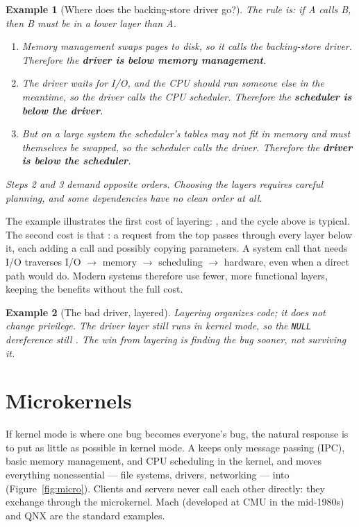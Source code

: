 \documentclass[11pt]{article}
\newtheorem{example}{Example}
\begin{document}
\begin{example}[Where does the backing-store driver go?]
The rule is: if A calls B, then B must be in a \emph{lower} layer than A.
\begin{enumerate}
  \item Memory management swaps pages to disk, so it calls the backing-store
        driver. Therefore the \textbf{driver is below memory management}.
  \item The driver waits for I/O, and the CPU should run someone else in the
        meantime, so the driver calls the CPU scheduler. Therefore the
        \textbf{scheduler is below the driver}.
  \item But on a large system the scheduler's tables may not fit in memory
        and must themselves be swapped, so the scheduler calls the driver.
        Therefore the \textbf{driver is below the scheduler}.
\end{enumerate}
Steps 2 and 3 demand opposite orders. Choosing the layers requires careful
planning, and some dependencies have no clean order at all.
\end{example}

The example illustrates the first cost of layering: , and the cycle above is typical. The second cost is that : a request from the top passes through every layer below it,
each adding a call and possibly copying parameters. A system call that needs
I/O traverses I/O $\to$ memory $\to$ scheduling $\to$ hardware, even when a
direct path would do. Modern systems therefore use fewer, more functional
layers, keeping the benefits without the full cost.

\begin{example}[The bad driver, layered]
Layering organizes code; it does not change privilege. The driver layer still
runs in kernel mode, so the \texttt{NULL} dereference still . The win from layering is finding the bug sooner, not surviving
it.
\end{example}

\section{Microkernels}
\label{sec:micro}

\noindent{}

If kernel mode is where one bug becomes everyone's bug, the natural response is
to put as little as possible in kernel mode. A  keeps only
message passing (IPC), basic memory management, and CPU scheduling in the
kernel, and moves everything nonessential --- file systems, drivers, networking
--- into  (Figure~\ref{fig:micro}). Clients and servers
never call each other directly: they exchange  through the
microkernel. Mach (developed at CMU in the mid-1980s) and QNX are the standard
examples.
\end{document}
